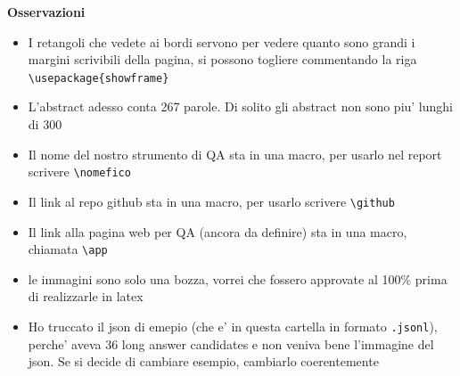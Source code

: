 \documentclass[10pt,hidelinks]{article}
\begin{document}
\begin{mdframed}[style=MyFrame,nobreak=true,align=center,userdefinedwidth=30em]
\textbf{Osservazioni}

\begin{itemize}
    \item I retangoli che vedete ai bordi servono per vedere quanto sono grandi i margini scrivibili della pagina, si possono togliere commentando la riga \texttt{\textbackslash usepackage\{showframe\}}
    \item L'abstract adesso conta 267 parole. Di solito gli abstract non sono piu' lunghi di 300
    \item Il nome del nostro strumento di QA sta in una macro, per usarlo nel report scrivere \texttt{\textbackslash nomefico}
    \item Il link al repo github sta in una macro, per usarlo scrivere \texttt{\textbackslash github}
    \item Il link alla pagina web per QA (ancora da definire) sta in una macro, chiamata \texttt{\textbackslash app}
    \item le immagini sono solo una bozza, vorrei che fossero approvate al 100\% prima di realizzarle in latex
    \item Ho truccato il json di emepio (che e' in questa cartella in formato \texttt{.jsonl}), perche' aveva 36 long answer candidates e non veniva bene l'immagine del json. Se si decide di cambiare esempio, cambiarlo coerentemente
\end{itemize}
\end{mdframed}

\newpage
\end{document}
